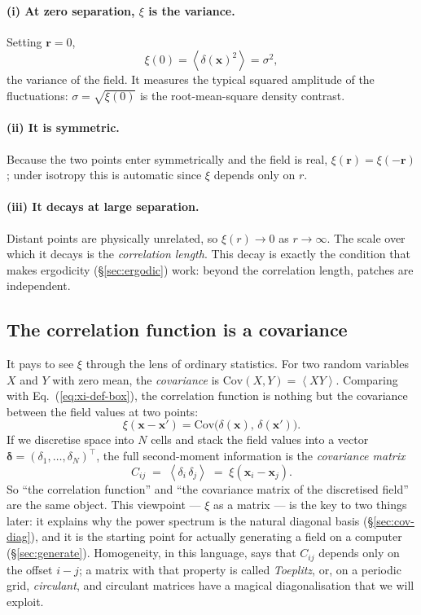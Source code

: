 \documentclass[12pt]{article}
\newcommand{\bx}{\mathbf{x}}
\newcommand{\br}{\mathbf{r}}
\newcommand{\avg}[1]{\left\langle #1 \right\rangle}
\begin{document}
\paragraph{(i) At zero separation, $\xi$ is the variance.}
Setting $\br = 0$,
\begin{equation}
  \xi(0) = \avg{\delta(\bx)^2} = \sigma^2 ,
  \label{eq:xi-zero}
\end{equation}
the variance of the field.  It measures the typical squared amplitude of
the fluctuations: $\sigma = \sqrt{\xi(0)}$ is the root-mean-square
density contrast.

\paragraph{(ii) It is symmetric.}
Because the two points enter symmetrically and the field is real,
$\xi(\br) = \xi(-\br)$; under isotropy this is automatic since $\xi$
depends only on $r$.

\paragraph{(iii) It decays at large separation.}
Distant points are physically unrelated, so $\xi(r) \to 0$ as $r \to
\infty$.  The scale over which it decays is the \emph{correlation
length}.  This decay is exactly the condition that makes ergodicity
(\S\ref{sec:ergodic}) work: beyond the correlation length, patches are
independent.

\subsection{The correlation function is a covariance}
\label{sec:xi-covariance}

It pays to see $\xi$ through the lens of ordinary statistics.  For two
random variables $X$ and $Y$ with zero mean, the \emph{covariance} is
$\mathrm{Cov}(X, Y) = \avg{XY}$.  Comparing with
Eq.~(\ref{eq:xi-def-box}), the correlation function is nothing but the
covariance between the field values at two points:
\begin{equation}
  \xi(\bx - \bx') = \mathrm{Cov}\bigl(\delta(\bx),\,\delta(\bx')\bigr).
\end{equation}
If we discretise space into $N$ cells and stack the field values into a
vector $\boldsymbol\delta = (\delta_1, \dots, \delta_N)^\top$, the full
second-moment information is the \emph{covariance matrix}
\begin{equation}
  C_{ij} \;=\; \avg{\delta_i\,\delta_j} \;=\; \xi(\bx_i - \bx_j).
  \label{eq:covmatrix}
\end{equation}
So ``the correlation function'' and ``the covariance matrix of the
discretised field'' are the same object.  This viewpoint --- $\xi$ as a
matrix --- is the key to two things later: it explains why the power
spectrum is the natural diagonal basis (\S\ref{sec:cov-diag}), and it is
the starting point for actually generating a field on a computer
(\S\ref{sec:generate}).  Homogeneity, in this language, says that $C_{ij}$
depends only on the offset $i - j$; a matrix with that property is called
\emph{Toeplitz}, or, on a periodic grid, \emph{circulant}, and circulant
matrices have a magical diagonalisation that we will exploit.
\end{document}
